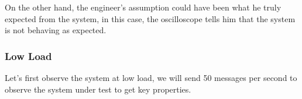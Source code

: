 \begin{figure}[H]
\begin{subfigure}{.5\textwidth}
                \label{fig:sub2}
            \end{subfigure}
            \label{fig:w1w2hb}
            \end{figure}

    On the other hand, the engineer's assumption could have been what he truly expected from the system, in this case, the oscilloscope tells him that the system is not behaving as expected. 

    \subsubsection{Low Load} 
    Let's first observe the system at low load, we will send 50 messages per second to observe the system under test to get key properties.

